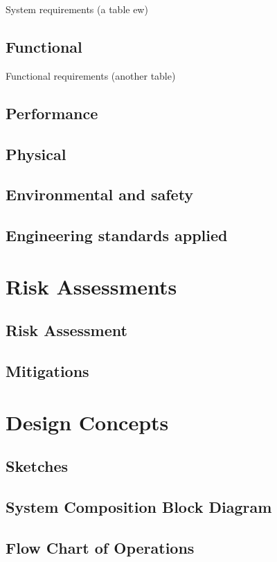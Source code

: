 \documentclass[a4paper,10pt]{article}
\begin{document}
System requirements (a table ew)

\subsection{Functional} %

Functional requirements (another table)

\subsection{Performance} %
\subsection{Physical} %
\subsection{Environmental and safety} %
\subsection{Engineering standards applied}
\section{Risk Assessments}
\subsection{Risk Assessment} %
\subsection{Mitigations} %
\section{Design Concepts}
\subsection{Sketches}
\subsection{System Composition Block Diagram}
\subsection{Flow Chart of Operations}
\end{document}
